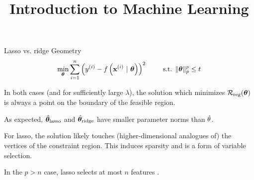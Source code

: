\documentclass[11pt,compress,t,notes=noshow, xcolor=table]{beamer}
\title{Introduction to Machine Learning}
\begin{document}


\begin{vbframe}{Lasso vs. ridge Geometry}
$$ 
  \min_{\bm{\theta}} \sum\limits_{i=1}^n \left(y^{(i)} - f\left(\mathbf{x}^{(i)} ~|~ \bm{\theta}\right)\right)^2 \qquad \text{ s.t. } \|\bm{\theta}\|_p^p  \leq t 
$$ 
  \vspace{-0.5cm}
  \begin{figure}
    \centering
  \end{figure}

  \begin{itemize}
    \item \small{In both cases (and for sufficiently large $\lambda$), the solution which minimizes $\mathcal{R}_{\text{reg}}(\bm{\theta})$ is always a point on the boundary of the feasible region.
    \item As expected, $\hat{\bm{\theta}}_{\text{lasso}}$ and $\hat{\bm{\theta}}_{\text{ridge}}$ have smaller parameter norms than $\hat{\theta}$.}
    \item For lasso, the solution likely touches (higher-dimensional analogues of) the vertices of the constraint region. This induces sparsity and is a form of variable selection.
    \item In the $p>n$ case, lasso selects at most $n$ features .
    
  \end{itemize}
  
\end{vbframe}
\end{document}
